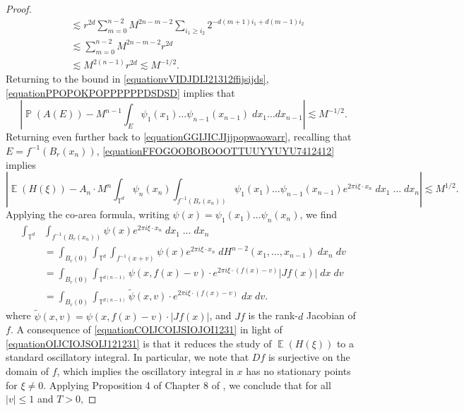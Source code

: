 \documentclass[dvipsnames,letterpaper,12pt]{article}
\numberwithin{equation}{section}
\DeclareMathOperator{\TT}{\mathbb{T}}
\numberwithin{theorem}{section}
\DeclareMathOperator{\EE}{\mathbb{E}}
\DeclareMathOperator{\PP}{\mathbb{P}}
\begin{document}
\begin{proof}
\begin{equation}
\begin{split}
        &\lesssim r^{2d} \sum_{m = 0}^{n-2} M^{2n-m-2} \sum_{i_1 \geq i_2} 2^{-d(m+1)i_1 + d(m-1)i_2}\\
        &\lesssim \sum_{m = 0}^{n-2} M^{2n-m-2} r^{2d}\\
        &\lesssim M^{2(n-1)} r^{2d} \lesssim M^{-1/2}.
    \end{split}
    \end{equation}
    Returning to the bound in \eqref{equationvVIDJDIJ21312ffijsijds}, \eqref{equationPPOPOKPOPPPPPPDSDSD} implies that
    \begin{equation} \label{equationFFOGOOBOBOOOTTUUYYUYU7412412}
        \left| \PP(A(E)) - M^{n-1} \int_E \psi_1(x_1) \dots \psi_{n-1}(x_{n-1})\; dx_1 \dots dx_{n-1} \right| \lesssim M^{-1/2}.
    \end{equation}
    Returning even further back to \eqref{equationGGIJICJIjjpopwaowarr}, recalling that $E = f^{-1}(B_r(x_n))$, \eqref{equationFFOGOOBOBOOOTTUUYYUYU7412412} implies
    \begin{equation} \label{equationOIJCIOJSOIJ121231}
        \left| \EE(H(\xi)) - A_n \cdot M^n \int_{\TT^d} \psi_n(x_n) \int_{f^{-1}(B_r(x_n))} \psi_1(x_1) \dots \psi_{n-1}(x_{n-1}) e^{2 \pi i \xi \cdot x_n}\; dx_1\; \dots\; dx_n \right| \lesssim M^{1/2}.
    \end{equation}
    Applying the co-area formula, writing $\psi(x) = \psi_1(x_1) \dots \psi_n(x_n)$, we find
    \begin{equation} \label{equationCOIJCOIJSIOJOI1231}
    \begin{split}
        \int_{\TT^d} & \int_{f^{-1}(B_r(x_n))} \psi(x) e^{2 \pi i \xi \cdot x_n}\; dx_1\; \dots\; dx_n\\
        &= \int_{B_r(0)} \int_{\TT^d} \int_{f^{-1}(x + v)} \psi(x) e^{2 \pi i \xi \cdot x_n}\; dH^{n-2}(x_1,\dots,x_{n-1})\; dx_n\; dv\\
        &= \int_{B_r(0)} \int_{\TT^{d(n-1)}} \psi(x,f(x) - v) \cdot e^{2 \pi i \xi \cdot (f(x) - v)} |Jf(x)|\; dx\; dv\\
        &= \int_{B_r(0)} \int_{\TT^{d(n-1)}} \tilde{\psi}(x,v) \cdot e^{2 \pi i \xi \cdot (f(x) - v)}\; dx\; dv.
    \end{split}
    \end{equation}
    where $\tilde{\psi}(x,v) = \psi(x,f(x) - v) \cdot |Jf(x)|$, and $Jf$ is the rank-$d$ Jacobian of $f$. A consequence of \eqref{equationCOIJCOIJSIOJOI1231} in light of \eqref{equationOIJCIOJSOIJ121231} is that it reduces the study of $\EE(H(\xi))$ to a standard oscillatory integral. In particular, we note that $Df$ is surjective on the domain of $f$, which implies the oscillatory integral in $x$ has no stationary points for $\xi \neq 0$. Applying Proposition 4 of Chapter 8 of \cite{Stein}, we conclude that for all $|v| \leq 1$ and $T > 0$,

\end{proof}
\end{document}
